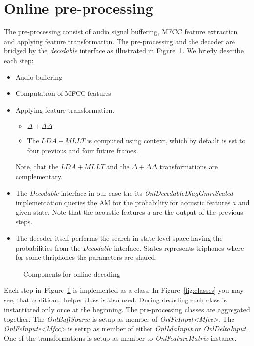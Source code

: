 \section{Online pre-processing} 
\label{sec:onl_preprocess}
The pre-processing consist of audio signal buffering, \ac{MFCC} feature extraction and
applying feature transformation. 
The pre-processing and the decoder are bridged by the {\it decodable} 
interface as illustrated in Figure~\ref{fig:online_pipeline}.
We briefly describe each step:
\begin{itemize}
    \item Audio buffering
    \item Computation of \ac{MFCC} features
    \item Applying feature transformation. 
        \begin{itemize}
            \item $\Delta + \Delta\Delta$ 
            \item The $LDA+MLLT$ is computed using context,
                which by default is set to four previous and four future frames.
        \end{itemize}
        Note, that the $LDA+MLLT$ and the $\Delta+\Delta\Delta$ transformations are complementary.
    \item The {\it Decodable}\/ interface in our case the its {\it OnlDecodableDiagGmmScaled}\/ implementation
        queries the \ac{AM} for the probability for acoustic features $a$ and given state.
        Note that the acoustic features $a$ are the output of the previous steps.
    \item The decoder itself performs the search in state level space 
        having the probabilities from the {\it Decodable}\/ interface. 
        States represents triphones where for some thriphones the parameters are shared.
\end{itemize}

\begin{figure}[!htp]
    \begin{center}
        
        \caption{Components for online decoding}
    \label{fig:online_pipeline} 
    \end{center}
\end{figure}

Each step in~Figure~\ref{fig:online_pipeline} is implemented as a class.
In Figure~\ref{fig:classes} you may see, that additional helper class is also used.
During decoding each class is instantiated only once at the beginning.
The pre-processing classes are aggregated together. 
The {\it OnlBuffSource}\/ is setup as member of {\it OnlFeInput<Mfcc>}\/.
The {\it OnlFeInpute<Mfcc>}\/ is setup as member of either {\it OnlLdaInput}\/ or {\it OnlDeltaInput}\/.
One of the transformations is setup as member to {\it OnlFeatureMatrix}\/ instance.

